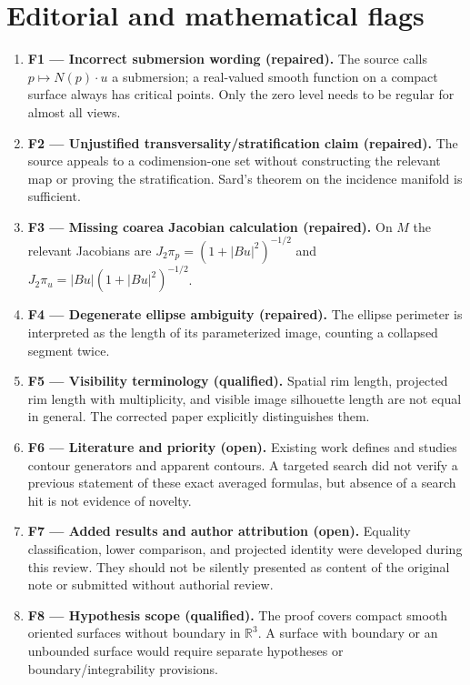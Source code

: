 \documentclass[11pt,a4paper]{article}
\begin{document}
\section*{Editorial and mathematical flags}
\begin{enumerate}[leftmargin=*,itemsep=4pt]
\item \textbf{F1 --- Incorrect submersion wording (repaired).} The source calls $p\mapsto N(p)\cdot u$ a submersion; a real-valued smooth function on a compact surface always has critical points. Only the zero level needs to be regular for almost all views.
\item \textbf{F2 --- Unjustified transversality/stratification claim (repaired).} The source appeals to a codimension-one set without constructing the relevant map or proving the stratification. Sard's theorem on the incidence manifold is sufficient.
\item \textbf{F3 --- Missing coarea Jacobian calculation (repaired).} On $M$ the relevant Jacobians are $J_2\pi_p=(1+|Bu|^2)^{-1/2}$ and $J_2\pi_u=|Bu|(1+|Bu|^2)^{-1/2}$.
\item \textbf{F4 --- Degenerate ellipse ambiguity (repaired).} The ellipse perimeter is interpreted as the length of its parameterized image, counting a collapsed segment twice.
\item \textbf{F5 --- Visibility terminology (qualified).} Spatial rim length, projected rim length with multiplicity, and visible image silhouette length are not equal in general. The corrected paper explicitly distinguishes them.
\item \textbf{F6 --- Literature and priority (open).} Existing work defines and studies contour generators and apparent contours. A targeted search did not verify a previous statement of these exact averaged formulas, but absence of a search hit is not evidence of novelty.
\item \textbf{F7 --- Added results and author attribution (open).} Equality classification, lower comparison, and projected identity were developed during this review. They should not be silently presented as content of the original note or submitted without authorial review.
\item \textbf{F8 --- Hypothesis scope (qualified).} The proof covers compact smooth oriented surfaces without boundary in $\mathbb R^3$. A surface with boundary or an unbounded surface would require separate hypotheses or boundary/integrability provisions.
\end{enumerate}
\end{document}
